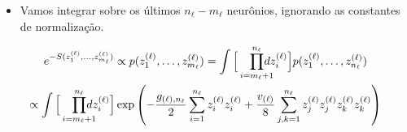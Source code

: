 \documentclass{beamer}
\def\eell{{(\ell)}}
\begin{document}
\begin{frame}
	\begin{itemize}
		\item Vamos integrar sobre os últimos $n_\ell - m_\ell$ neurônios, ignorando as constantes de normalização.
	\end{itemize}\small
	\begin{multline*}
		e^{-S(z_1^\eell, \ldots, z_{m_\ell}^\eell)} \propto p(z_1^\eell, \ldots, z_{m_\ell}^\eell ) = \int\Big[\prod_{i=m_\ell+1}^{n_\ell} \hspace*{-10pt}dz_i^\eell\Big] p(z_1^\eell, \ldots, z_{n_\ell}^\eell ) \\ 
		\propto \int\Big[\prod_{i=m_\ell+1}^{n_\ell} \hspace*{-10pt}dz_i^\eell\Big] \exp\left(-\frac{g_{\eell,n_\ell}}{2}\sum_{i=1}^{n_\ell}  z_i^\eell z_i^\eell + \frac{v_{\eell}}{8}\sum_{j,k=1}^{n_\ell}  z_j^\eell z_j^\eell z_k^\eell z_k^\eell\right)\\
	\end{multline*}
\end{frame}
\end{document}

